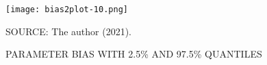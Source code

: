 \begin{figure}[H]
 \setlength{\abovecaptionskip}{.0001pt}
 \caption{PARAMETER BIAS WITH 2.5\% AND 97.5\% QUANTILES}
 \vspace{0.2cm}\centering
 \texttt{[image: bias2plot-10.png]}\\
 \begin{footnotesize}
  SOURCE: The author (2021).
 \end{footnotesize}
 \label{fig:biaslogs2_4}
\end{figure}





